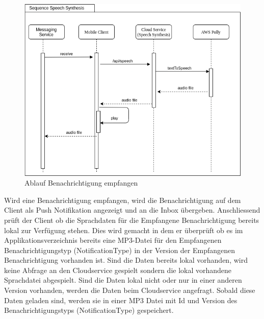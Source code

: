 \begin{figure}[h]
    \centering
    \begin{minipage}[b]{0.9\textwidth}
        \includegraphics[width=\textwidth]{graphics/diagramms/Sequence_Speech_Synth_V01}
        \caption{Ablauf Benachrichtigung empfangen}
    \end{minipage}
\end{figure}

Wird eine Benachrichtigung empfangen, wird die Benachrichtigung auf dem Client als Push Notifikation angezeigt und an die Inbox übergeben.
Anschliessend prüft der Client ob die Sprachdaten für die Empfangene Benachrichtigung bereits lokal zur Verfügung stehen.
Dies wird gemacht in dem er überprüft ob es im Applikationsverzeichnis bereits eine MP3-Datei für den Empfangenen Benachrichtigungstyp
(NotificationType) in der Version der Empfangenen Benachrichtigung vorhanden ist.
Sind die Daten bereits lokal vorhanden, wird keine Abfrage an den Cloudservice gespielt sondern die lokal vorhandene Sprachdatei abgespielt.
Sind die Daten lokal nicht oder nur in einer anderen Version vorhanden, werden die Daten beim Cloudservice angefragt.
Sobald diese Daten geladen sind, werden sie in einer MP3 Datei mit Id und Version des Benachrichtigungstyps (NotificationType) gespeichert.

\clearpage
